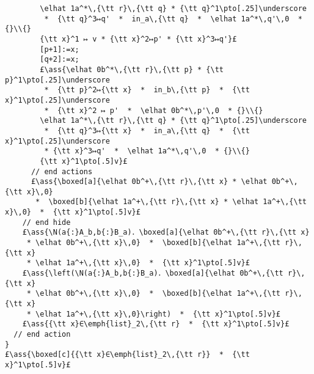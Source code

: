 \documentclass[12pt,a4paper]{article}
\makeatletter
\newcommand{\ml}[2][t]{\mbox{\mdseries\begin{tabular}[#1]{@{}L@{}}#2\end{tabular}}}
\newcommand{\ass}[1]{\ensuremath{{\color{blue}\left\{\ml[c]{#1}\right\}}}}
\makeatother
\begin{document}
\begin{lstlisting}
        \elhat 1a^*\,{\tt r}\,{\tt q} * {\tt q}^1\pto[.25]\underscore 
         *  {\tt q}^3↦q'  *  in_a\,{\tt q}  *  \elhat 1a^*\,q'\,0  * {}\\{} 
        {\tt x}^1 ↦ v * {\tt x}^2↦p' * {\tt x}^3↦q'}£
        [p+1]:=x;
        [q+2]:=x;
        £\ass{\elhat 0b^*\,{\tt r}\,{\tt p} * {\tt p}^1\pto[.25]\underscore
         *  {\tt p}^2↦{\tt x}  *  in_b\,{\tt p}  *  {\tt x}^1\pto[.25]\underscore 
         *  {\tt x}^2 ↦ p'  *  \elhat 0b^*\,p'\,0  * {}\\{}
        \elhat 1a^*\,{\tt r}\,{\tt q} * {\tt q}^1\pto[.25]\underscore 
         *  {\tt q}^3↦{\tt x}  *  in_a\,{\tt q}  *  {\tt x}^1\pto[.25]\underscore 
         * {\tt x}^3↦q'  *  \elhat 1a^*\,q'\,0  * {}\\{}
        {\tt x}^1\pto[.5]v}£
      // end actions
      £\ass{\boxed[a]{\elhat 0b^+\,{\tt r}\,{\tt x} * \elhat 0b^+\,{\tt x}\,0} 
       *  \boxed[b]{\elhat 1a^+\,{\tt r}\,{\tt x} * \elhat 1a^+\,{\tt x}\,0}  *  {\tt x}^1\pto[.5]v}£
    // end hide
    £\ass{\N(a{:}A_b,b{:}B_a)．\boxed[a]{\elhat 0b^+\,{\tt r}\,{\tt x} 
     * \elhat 0b^+\,{\tt x}\,0}  *  \boxed[b]{\elhat 1a^+\,{\tt r}\,{\tt x} 
     * \elhat 1a^+\,{\tt x}\,0}  *  {\tt x}^1\pto[.5]v}£
    £\ass{\left(\N(a{:}A_b,b{:}B_a)．\boxed[a]{\elhat 0b^+\,{\tt r}\,{\tt x}
     * \elhat 0b^+\,{\tt x}\,0}  *  \boxed[b]{\elhat 1a^+\,{\tt r}\,{\tt x}
     * \elhat 1a^+\,{\tt x}\,0}\right)  *  {\tt x}^1\pto[.5]v}£
    £\ass{{\tt x}∈\emph{list}_2\,{\tt r}  *  {\tt x}^1\pto[.5]v}£
  // end action
}
£\ass{\boxed[c]{{\tt x}∈\emph{list}_2\,{\tt r}}  *  {\tt x}^1\pto[.5]v}£

\end{lstlisting}
\end{document}
